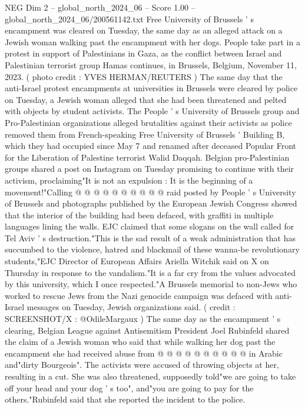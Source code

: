 \begin{textsample}{NEG Dim 2 – global\_north\_2024\_06 – Score 1.00 – global\_north\_2024\_06/200561142.txt}  \label{ex:f2_neg_193}
Free University of Brussels ' s encampment was cleared on Tuesday, the same day as an alleged attack on a Jewish woman walking past the encampment with her dogs.
People take part in a protest in support of Palestinians in Gaza, as the conflict between Israel and Palestinian terrorist group Hamas continues, in Brussels, Belgium, November 11, 2023. ( photo credit : YVES HERMAN/REUTERS ) The same day that the anti-Israel protest encampments at universities in Brussels were cleared by police on Tuesday, a Jewish woman alleged that she had been threatened and pelted with objects by student activists.
The People ' s University of Brussels group and Pro-Palestinian organizations alleged brutalities against their activists as police removed them from French-speaking Free University of Brussels ' Building B, which they had occupied since May 7 and renamed after deceased Popular Front for the Liberation of Palestine terrorist Walid Daqqah.
Belgian pro-Palestinian groups shared a post on Instagram on Tuesday promising to continue with their activism, proclaiming"It is not an expulsion : It is the beginning of a movement!"Calling @ @ @ @ @ @ @ @ @ @ raid posted by People ' s University of Brussels and photographs published by the European Jewish Congress showed that the interior of the building had been defaced, with graffiti in multiple languages lining the walls.
EJC claimed that some slogans on the wall called for Tel Aviv ' s destruction."This is the sad result of a weak administration that has succumbed to the violence, hatred and blackmail of these wanna-be revolutionary students,"EJC Director of European Affairs Ariella Witchik said on X on Thursday in response to the vandalism."It is a far cry from the values advocated by this university, which I once respected."A Brussels memorial to non-Jews who worked to rescue Jews from the Nazi genocide campaign was defaced with anti-Israel messages on Tuesday, Jewish organizations said. ( credit : SCREENSHOT/X : @OdileMargaux ) The same day as the encampment ' s clearing, Belgian League against Antisemitism President Joel Rubinfeld shared the claim of a Jewish woman who said that while walking her dog past the encampment she had received abuse from @ @ @ @ @ @ @ @ @ @ in Arabic and"dirty Bourgeois".
The activists were accused of throwing objects at her, resulting in a cut.
She was also threatened, supposedly told"we are going to take off your head and your dog ' s too", and"you are going to pay for the others."Rubinfeld said that she reported the incident to the police.

\end{textsample}
